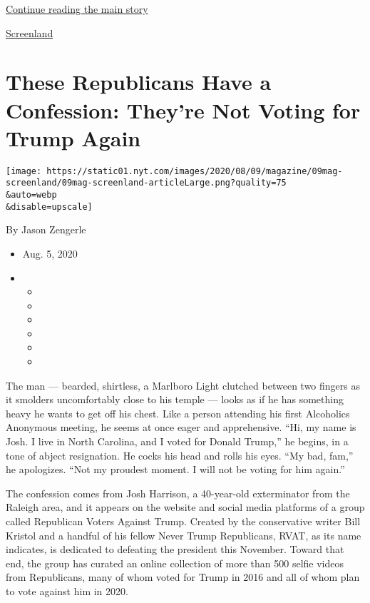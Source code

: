 \protect\hyperlink{after-sponsor}{Continue reading the main story}

\href{/column/screenland}{Screenland}

\hypertarget{these-republicans-have-a-confession-theyre-not-voting-for-trump-again}{%
\section{These Republicans Have a Confession: They're Not Voting for
Trump
Again}\label{these-republicans-have-a-confession-theyre-not-voting-for-trump-again}}

\texttt{[image: https://static01.nyt.com/images/2020/08/09/magazine/09mag-screenland/09mag-screenland-articleLarge.png?quality=75\\\&auto=webp\\\&disable=upscale]}

By Jason Zengerle

\begin{itemize}
\item
  Aug. 5, 2020
\item
  \begin{itemize}
  \item
  \item
  \item
  \item
  \item
  \item
  \end{itemize}
\end{itemize}

The man --- bearded, shirtless, a Marlboro Light clutched between two
fingers as it smolders uncomfortably close to his temple --- looks as if
he has something heavy he wants to get off his chest. Like a person
attending his first Alcoholics Anonymous meeting, he seems at once eager
and apprehensive. ``Hi, my name is Josh. I live in North Carolina, and I
voted for Donald Trump,'' he begins, in a tone of abject resignation. He
cocks his head and rolls his eyes. ``My bad, fam,'' he apologizes. ``Not
my proudest moment. I will not be voting for him again.''

The confession comes from Josh Harrison, a 40-year-old exterminator from
the Raleigh area, and it appears on the website and social media
platforms of a group called Republican Voters Against Trump. Created by
the conservative writer Bill Kristol and a handful of his fellow Never
Trump Republicans, RVAT, as its name indicates, is dedicated to
defeating the president this November. Toward that end, the group has
curated an online collection of more than 500 selfie videos from
Republicans, many of whom voted for Trump in 2016 and all of whom plan
to vote against him in 2020.

